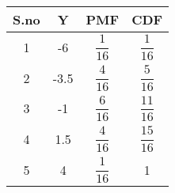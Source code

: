 
\begin{tabular}{|c|c|c|c|}
\hline
S.no	&Y	&PMF&CDF\\
\hline
1	&-6	&$ \dfrac{1}{16}$&$ \dfrac{1}{16}$\\\hline
2	&-3.5	&$ \dfrac{4}{16}$&$ \dfrac{5}{16}$\\\hline
3	&-1	&$\dfrac{6}{16}$&$ \dfrac{11}{16}$\\\hline
4	&1.5	&$\dfrac{4}{16}$&$ \dfrac{15}{16}$\\\hline
5	&4	&$ \dfrac{1}{16}$&1\\
\hline
\end{tabular}
